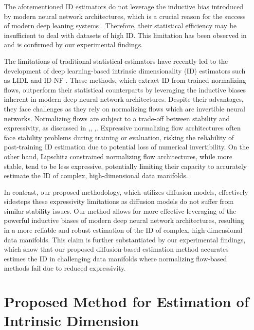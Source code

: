 The aforementioned ID estimators do not leverage the inductive bias introduced by modern neural network architectures, which is a crucial reason for the success of modern deep leaning systems \cite{goyal2022inductive}. Therefore, their statistical efficiency may be insufficient to deal with datasets of high ID. This limitation has been observed in  \cite{campadelli2015intrinsic, horvat2022nfid} and is confirmed by our experimental findings.


The limitations of traditional statistical estimators have recently led to the development of deep learning-based intrinsic dimensionality (ID) estimators such as LIDL \cite{tempczyk2022lidl} and ID-NF \cite{horvat2022nfid}. These methods, which extract ID from trained normalizing flows, outperform their statistical counterparts by leveraging the inductive biases inherent in modern deep neural network architectures. Despite their advantages, they face challenges as they rely on normalizing flows which are invertible neural networks. Normalizing flows are subject to a trade-off between stability and expressivity, as discussed in \cite{behrmann2021understandin},\cite{jaini2020tails}, \cite{cornish2020relaxing},\cite{laszkiewicz2021copula}. Expressive normalizing flow architectures often face stability problems during training or evaluation, risking the reliability of post-training ID estimation due to potential loss of numerical invertibility. On the other hand, Lipschitz constrained normalizing flow architectures, while more stable, tend to be less expressive, potentially limiting their capacity to accurately estimate the ID of complex, high-dimensional data manifolds.

In contrast, our proposed methodology, which utilizes diffusion models, effectively sidesteps these expressivity limitations as diffusion models do not suffer from similar stability issues. Our method allows for more effective leveraging of the powerful inductive biases of modern deep neural network architectures, resulting in a more reliable and robust estimation of the ID of complex, high-dimensional data manifolds. This claim is further substantiated by our experimental findings, which show that our proposed diffusion-based estimation method accurates estimes the ID in challenging data manifolds where normalizing flow-based methods fail due to reduced expressivity.

\section{Proposed Method for Estimation of Intrinsic Dimension}
\label{ch3:sec:method}


